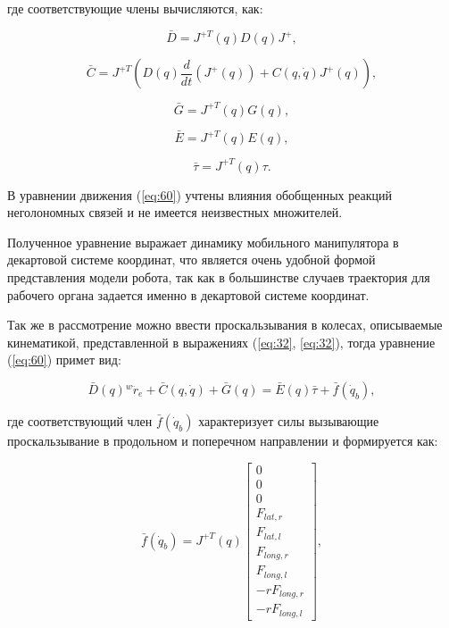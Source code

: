 \documentclass[14pt, a4paper]{extreport}
\begin{document}
\noindent
где соответствующие члены вычисляются, как:

\begin{equation}
\bar{D} = J^{+T}(q){D}(q)J^{+},
\tag{61} \label{eq:61}
\end{equation}

\begin{equation}
\bar{C} = J^{+T}\left(D(q)\dfrac{d}{dt}\left(J^{+}(q)\right) + C(q,\dot{q})J^{+}(q)\right),
\tag{62} \label{eq:62}
\end{equation}

\begin{equation}
\bar{G} = J^{+T}(q)G(q),
\tag{63} \label{eq:63}
\end{equation}

\begin{equation}
\bar{E} = J^{+T}(q)E(q),
\tag{64} \label{eq:64}
\end{equation}

\begin{equation}
\bar{\tau} = J^{+T}(q)\tau.
\tag{65} \label{eq:65}
\end{equation}

В уравнении движения (\ref{eq:60}) учтены влияния обобщенных реакций неголономных связей и не имеется неизвестных множителей. 

Полученное уравнение выражает динамику мобильного манипулятора в декартовой системе координат, что является очень удобной формой представления модели робота, так как в большинстве случаев траектория для рабочего органа задается именно в декартовой системе координат.

Так же в рассмотрение можно ввести проскальзывания в колесах, описываемые кинематикой, представленной в выражениях (\ref{eq:32}, \ref{eq:32}), тогда уравнение (\ref{eq:60}) примет вид:

\[
    \bar{D}(q){^w\ddot{r}_e} + \bar{C}(q,\dot{q}) + \bar{G}(q) = \bar{E}(q)\bar{\tau} + \bar{f}(\dot{q}_b), 
	\tag{60} \label{eq:60}
\]

\newpage
\noindent
где соответствующий член $\bar{f}(\dot{q}_b)$ характеризует силы вызывающие проскальзывание в продольном и поперечном направлении и формируется как:

\[
\bar{f}(\dot{q}_b) = J^{+T}(q)
\begin{bmatrix}
0 \\[1mm] 0 \\[1mm] 0 \\[1mm] F_{lat,r} \\[1mm] F_{lat,l}\\[1mm] F_{long,r} \\[1mm] F_{long,l}\\[1mm] -rF_{long,r} \\[1mm] -rF_{long,l}
\end{bmatrix},
\]
\end{document}
